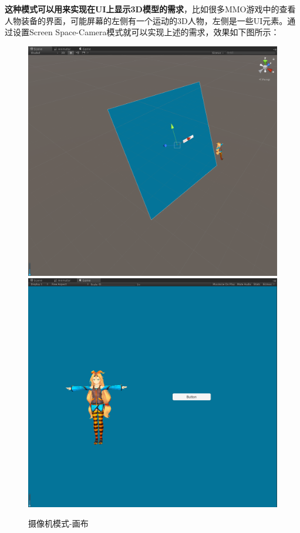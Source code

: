 \documentclass[UTF8,a4paper,12pt]{ctexbook}
\begin{document}
			\textbf{这种模式可以用来实现在UI上显示3D模型的需求}，比如很多MMO游戏中的查看人物装备的界面，可能屏幕的左侧有一个运动的3D人物，左侧是一些UI元素。通过设置Screen Space-Camera模式就可以实现上述的需求，效果如下图所示：
				\begin{figure}[H]
					\centering
					\includegraphics[scale=0.3]{Canva-1.png}
					\includegraphics[scale=0.3]{Canvas.png}
					\caption{摄像机模式-画布}
				\end{figure}
			
\end{document}
